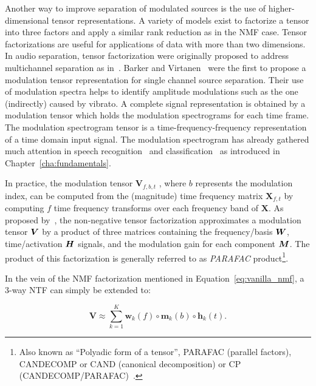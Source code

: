 
Another way to improve separation of modulated sources is the use of higher-dimensional tensor representations.
A variety of models exist to factorize a tensor into three factors and apply a similar rank reduction as in the NMF case.
Tensor factorizations are useful for applications of data with more than two dimensions.
In audio separation, tensor factorization were originally proposed to address multichannel separation as in~\cite{fitzgerald08, fevotte10, ozerov11}. 
Barker and Virtanen~\cite{barker13} were the first to propose a modulation tensor representation for single channel source separation. 
Their use of modulation spectra helps to identify amplitude modulations such as the one (indirectly) caused by vibrato. 
A complete signal representation is obtained by a modulation tensor which holds the modulation spectrograms for each time frame.
The modulation spectrogram tensor is a time-frequency-frequency representation of a time domain input signal.
The modulation spectrogram has already gathered much attention in speech recognition~\cite{greenberg97, kingsbury98} and classification~\cite{kinnunen08, markaki09} as introduced in Chapter~\ref{cha:fundamentals}.
\par
In practice, the modulation tensor \(\mathbf{V}_{f, b, t}\) , where \(b\) represents the modulation index, can be computed from the (magnitude) time frequency matrix \(\mathbf{X}_{f, t}\) by computing \(f\) time frequency transforms over each frequency band of \(\mathbf{X}\).
As proposed by~\cite{barker13}, the non-negative tensor factorization approximates a modulation tensor \({\bm{V}}\) by a product of three matrices containing the frequency/basis \({\bm{W}}\), time/activation \({\bm{H}}\) signals, and the modulation gain for each component \({\bm{M}}\).
The product of this factorization is generally referred to as \emph{PARAFAC} product\footnote{Also known as ``Polyadic form of a tensor'', PARAFAC (parallel factors), CANDECOMP or CAND (canonical decomposition) or CP (CANDECOMP/PARAFAC)~\cite{kolda09}.}.

In the vein of the NMF factorization mentioned in Equation~\ref{eq:vanilla_nmf}, a 3-way NTF can simply be extended to:

\begin{equation}
   \mathbf{V} \approx \sum\limits_{k=1}^{K} \mathbf{w}_{k}(f) \circ \mathbf{m}_{k}(b) \circ \mathbf{h}_{k}(t).
\end{equation}

